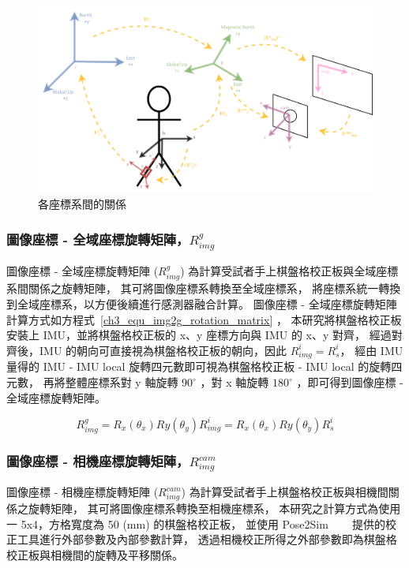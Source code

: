 \begin{figure}[!ht]
   \centering
   \includegraphics[width=\textwidth]{figure/ch3_fig_coordinate_trans.png}
    \caption[各座標系間的關係]{各座標系間的關係}
    \label{ch3_fig_coordinate_trans}
\end{figure}

\subsubsection{圖像座標 - 全域座標旋轉矩陣，$R^{g}_{img}$}
圖像座標 - 全域座標旋轉矩陣 ($R^{g}_{img}$) 為計算受試者手上棋盤格校正板與全域座標系間關係之旋轉矩陣，
其可將圖像座標系轉換至全域座標系，
將座標系統一轉換到全域座標系，以方便後續進行感測器融合計算。
圖像座標 - 全域座標旋轉矩陣計算方式如方程式~\ref{ch3_equ_img2g_rotation_matrix} ，
本研究將棋盤格校正板安裝上 IMU，並將棋盤格校正板的 x、y 座標方向與 IMU 的 x、y 對齊，
經過對齊後，IMU 的朝向可直接視為棋盤格校正板的朝向，因此 $R^{i}_{img} = R^{i}_{s}$，
經由 IMU 量得的 IMU - IMU local 旋轉四元數即可視為棋盤格校正板 - IMU local 的旋轉四元數，
再將整體座標系對 y 軸旋轉 $90^{\circ}$ ，對 x 軸旋轉 $180^{\circ}$ ，即可得到圖像座標 - 全域座標旋轉矩陣。

\begin{equation}
   R^{g}_{img} = R_{x}(\theta_{x})R{y}(\theta_{y})R^{i}_{img} = R_{x}(\theta_{x})R{y}(\theta_{y})R^{i}_{s}
   \label{ch3_equ_img2g_rotation_matrix}
\end{equation}

\subsubsection{圖像座標 - 相機座標旋轉矩陣，$R^{cam}_{img}$}
圖像座標 - 相機座標旋轉矩陣 ($R^{cam}_{img}$) 為計算受試者手上棋盤格校正板與相機間關係之旋轉矩陣，
其可將圖像座標系轉換至相機座標系，
本研究之計算方式為使用一 5x4，方格寬度為 50 (mm) 的棋盤格校正板，
並使用 Pose2Sim ~\cite{Pagnon_2022_JOSS}~\cite{Pagnon_2021_Robustness}~\cite{Pagnon_2022_Accuracy} 提供的校正工具進行外部參數及內部參數計算，
透過相機校正所得之外部參數即為棋盤格校正板與相機間的旋轉及平移關係。

